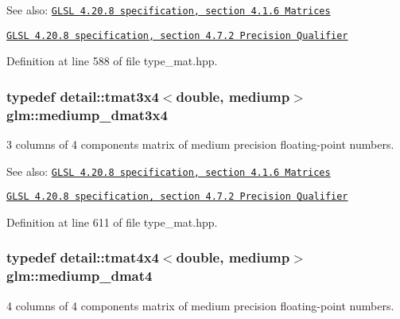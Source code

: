 \begin{Desc}
\item[See also:]\href{http://www.opengl.org/registry/doc/GLSLangSpec.4.20.8.pdf}{\tt GLSL 4.20.8 specification, section 4.1.6 Matrices} 

\href{http://www.opengl.org/registry/doc/GLSLangSpec.4.20.8.pdf}{\tt GLSL 4.20.8 specification, section 4.7.2 Precision Qualifier} \end{Desc}


Definition at line 588 of file type\_\-mat.hpp.\hypertarget{group__core__precision_gedd814e706701200b13b86fc6fd7b373}{
\subsubsection[mediump\_\-dmat3x4]{\setlength{\rightskip}{0pt plus 5cm}typedef detail::tmat3x4$<$double, mediump$>$ {\bf glm::mediump\_\-dmat3x4}}}
\label{group__core__precision_gedd814e706701200b13b86fc6fd7b373}


3 columns of 4 components matrix of medium precision floating-point numbers.

\begin{Desc}
\item[See also:]\href{http://www.opengl.org/registry/doc/GLSLangSpec.4.20.8.pdf}{\tt GLSL 4.20.8 specification, section 4.1.6 Matrices} 

\href{http://www.opengl.org/registry/doc/GLSLangSpec.4.20.8.pdf}{\tt GLSL 4.20.8 specification, section 4.7.2 Precision Qualifier} \end{Desc}


Definition at line 611 of file type\_\-mat.hpp.\hypertarget{group__core__precision_g73de517f040f7d50746bbe273a396685}{
\subsubsection[mediump\_\-dmat4]{\setlength{\rightskip}{0pt plus 5cm}typedef detail::tmat4x4$<$double, mediump$>$ {\bf glm::mediump\_\-dmat4}}}
\label{group__core__precision_g73de517f040f7d50746bbe273a396685}


4 columns of 4 components matrix of medium precision floating-point numbers.


